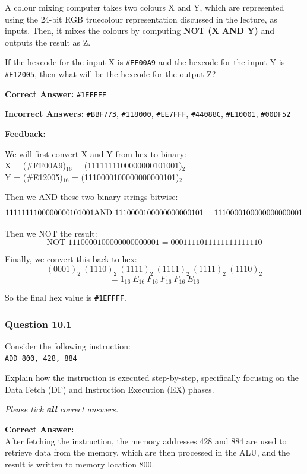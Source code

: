 A colour mixing computer takes two colours X and Y, which are represented using the 24-bit RGB truecolour representation discussed in the lecture, as inputs. Then, it mixes the colours by computing \textbf{NOT (X AND Y)} and outputs the result as Z.

If the hexcode for the input X is \texttt{\#FF00A9} and the hexcode for the input Y is \texttt{\#E12005}, then what will be the hexcode for the output Z?

\textbf{Correct Answer:} \texttt{\#1EFFFF}

\textbf{Incorrect Answers:}
\texttt{\#BBF773}, \texttt{\#118000}, \texttt{\#EE7FFF}, \texttt{\#44088C}, \texttt{\#E10001}, \texttt{\#00DF52}

\textbf{Feedback:}

We will first convert X and Y from hex to binary: \\
X = (\#FF00A9)$_{16}$ = (1111111100000000101001)$_2$ \\
Y = (\#E12005)$_{16}$ = (1110000100000000000101)$_2$

Then we AND these two binary strings bitwise:
\[
1111111100000000101001 \\
\text{AND } 1110000100000000000101 = 1110000100000000000001
\]

Then we NOT the result:
\[
\text{NOT } 1110000100000000000001 = 0001111011111111111110
\]

Finally, we convert this back to hex:
\[
(0001)_2 \ (1110)_2 \ (1111)_2 \ (1111)_2 \ (1111)_2 \ (1110)_2
\]
\[
= 1_{16} \ E_{16} \ F_{16} \ F_{16} \ F_{16} \ E_{16}
\]

So the final hex value is \texttt{\#1EFFFF}.

\subsubsection{Question 10.1}

Consider the following instruction: \\
\texttt{ADD 800, 428, 884}

Explain how the instruction is executed step-by-step, specifically focusing on the Data Fetch (DF) and Instruction Execution (EX) phases.

\textit{Please tick \textbf{all} correct answers.}

\textbf{Correct Answer:} \\
After fetching the instruction, the memory addresses 428 and 884 are used to retrieve data from the memory, which are then processed in the ALU, and the result is written to memory location 800.


